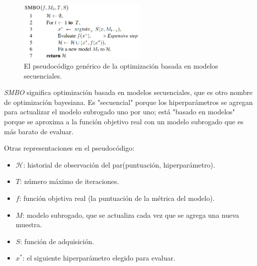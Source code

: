 \documentclass[a4paper,12pt]{article}
\begin{document}
\begin{figure}[H]
	\begin{center}
	\includegraphics[width=0.55\textwidth]{smbo.png}
  	\caption{El pseudocódigo genérico de la optimización  basada en modelos secuenciales.}
  	\label{fig:smbo}
  	\end{center}
\end{figure}

\textit{SMBO} significa optimización basada en modelos secuenciales, que es otro nombre de optimización bayesiana. Es "secuencial" porque los hiperparámetros se agregan para actualizar el modelo subrogado uno por uno; está "basado en modelos" porque se aproxima a la función objetivo real con un modelo subrogado que es más barato de evaluar.

Otras representaciones en el pseudocódigo:
\begin{itemize}[noitemsep, topsep=2pt]
	\item{$\mathcal{H}$: historial de observación del par(puntuación, hiperparámetro).}
	\item{$T$: número máximo de iteraciones.}
	\item{$f$: función objetiva real (la puntuación de la métrica del modelo).}
	\item{$M$: modelo subrogado, que se actualiza cada vez que se agrega una nueva muestra.}
	\item{$S$: función de adquisición.}
	\item{$x^*$: el siguiente hiperparámetro elegido para evaluar.}
\end{itemize}

\bigskip
\end{document}
